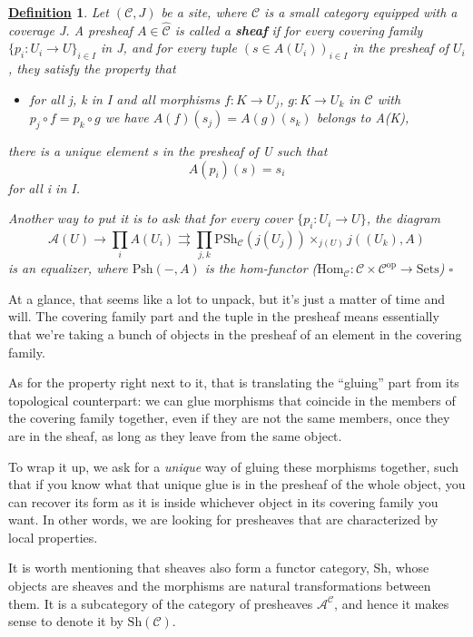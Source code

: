 \documentclass{article}
\newtheorem*{def*}{\underline{Definition}}
\begin{document}
\begin{def*}
	Let \((\mathcal{C}, J)\) be a site, where \(\mathcal{C}\) is a small category equipped with a coverage J. A presheaf \(A\in \hat{\mathcal{C}}\) is called a \textbf{sheaf} if for every covering family \(\{p_{i}:U_{i}\rightarrow U\}_{i\in I}\) in J, and for every tuple \((s\in A(U_{i}))_{i\in I}\) in the presheaf of \(U_{i}\), they satisfy the property that
	\begin{itemize}
		\item for all j, k in I and all morphisms \(f:K\rightarrow U_{j}\), \(g:K\rightarrow U_{k}\) in \(\mathcal{C}\) with \(p_{j}\circ f=p_{k}\circ g\) we have \(A(f)(s_{j})=A(g)(s_{k})\) belongs to A(K),
	\end{itemize}
	there is a unique element s in the presheaf of U such that
	\[
		A(p_{i})(s)=s_{i}
	\]
	for all i in I.

	Another way to put it is to ask that for every cover \(\{p_{i }:U_{i}\rightarrow U\}\), the diagram
	\[
		\mathcal{A}(U)\rightarrow \prod\limits_{i}^{}A(U_{i})\rightrightarrows \prod\limits_{j, k}^{} \mathrm{PSh}_{\mathcal{C}}(j(U_{j}))\times_{j(U)}j((U_{k}), A)
	\]
	is an equalizer, where \(\mathrm{Psh}(-, A)\) is the hom-functor (\(\mathrm{Hom}_{\mathcal{C}}:\mathcal{C}\times \mathcal{C}^{\mathrm{op}}\rightarrow \mathrm{Sets}\)) \(\square\)
\end{def*}

At a glance, that seems like a lot to unpack, but it's just a matter of time and will. The covering family part and the tuple in the presheaf means essentially that we're taking a bunch of objects in the presheaf of an element in the covering family.

As for the property right next to it, that is translating the ``gluing'' part from its topological counterpart: we can glue morphisms that coincide in the members of the covering family together, even if they are not the same members, once they are in the sheaf, as long as they leave from the same object.

To wrap it up, we ask for a \textit{unique} way of gluing these morphisms together, such that if you know what that unique glue is in the presheaf of the whole object, you can recover its form as it is inside whichever object in its covering family you want. In other words, we are looking for presheaves that are characterized by local properties.

It is worth mentioning that sheaves also form a functor category, Sh, whose objects are sheaves and the morphisms are natural transformations between them. It is a subcategory of the category of presheaves \(\mathcal{A}^{\mathcal{C}}\), and hence it makes sense to denote it by \( \mathrm{Sh}(\mathcal{C})\).
\end{document}
